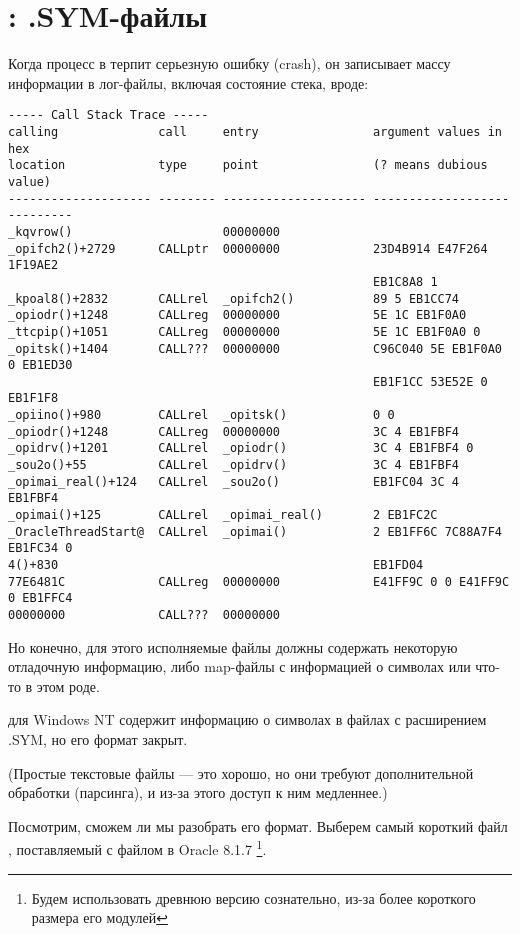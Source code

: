 \section{\oracle: .SYM-файлы}
\myindex{\oracle}
\label{Oracle_SYM_files_example}

Когда процесс в \oracle терпит серьезную ошибку (crash), он записывает массу информации в лог-файлы,
включая состояние стека, вроде:

\begin{lstlisting}
----- Call Stack Trace -----
calling              call     entry                argument values in hex      
location             type     point                (? means dubious value)     
-------------------- -------- -------------------- ----------------------------
_kqvrow()                     00000000             
_opifch2()+2729      CALLptr  00000000             23D4B914 E47F264 1F19AE2
                                                   EB1C8A8 1
_kpoal8()+2832       CALLrel  _opifch2()           89 5 EB1CC74
_opiodr()+1248       CALLreg  00000000             5E 1C EB1F0A0
_ttcpip()+1051       CALLreg  00000000             5E 1C EB1F0A0 0
_opitsk()+1404       CALL???  00000000             C96C040 5E EB1F0A0 0 EB1ED30
                                                   EB1F1CC 53E52E 0 EB1F1F8
_opiino()+980        CALLrel  _opitsk()            0 0
_opiodr()+1248       CALLreg  00000000             3C 4 EB1FBF4
_opidrv()+1201       CALLrel  _opiodr()            3C 4 EB1FBF4 0
_sou2o()+55          CALLrel  _opidrv()            3C 4 EB1FBF4
_opimai_real()+124   CALLrel  _sou2o()             EB1FC04 3C 4 EB1FBF4
_opimai()+125        CALLrel  _opimai_real()       2 EB1FC2C
_OracleThreadStart@  CALLrel  _opimai()            2 EB1FF6C 7C88A7F4 EB1FC34 0
4()+830                                            EB1FD04
77E6481C             CALLreg  00000000             E41FF9C 0 0 E41FF9C 0 EB1FFC4
00000000             CALL???  00000000             
\end{lstlisting}

Но конечно, для этого исполняемые файлы \oracle должны содержать некоторую отладочную информацию,
либо map-файлы с информацией о символах или что-то в этом роде.

\oracle для Windows NT содержит информацию о символах в файлах с расширением .SYM, но его формат закрыт.

(Простые текстовые файлы --- это хорошо, но они требуют дополнительной обработки (парсинга), и из-за этого доступ
к ним медленнее.)

Посмотрим, сможем ли мы разобрать его формат.
Выберем самый короткий файл , поставляемый с файлом  в Oracle 8.1.7
\footnote{Будем использовать древнюю версию \oracle сознательно, из-за более короткого размера его модулей}.

